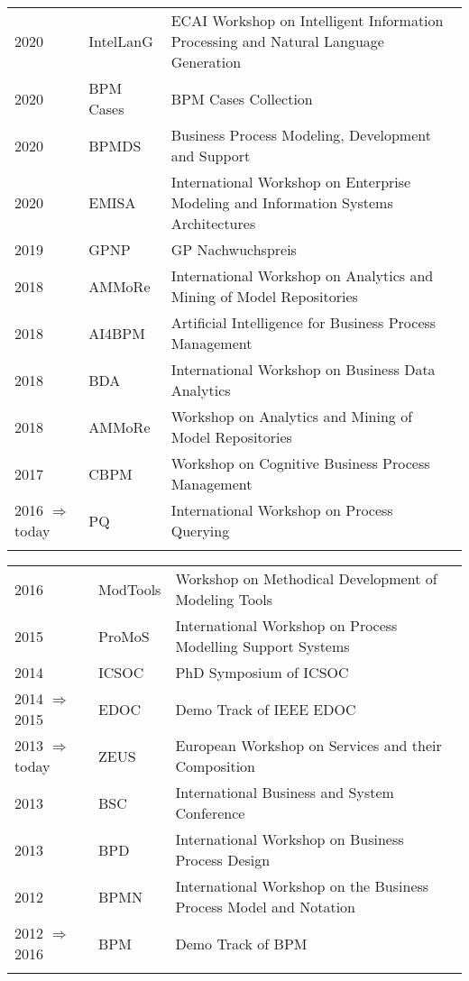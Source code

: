 \raggedright
\begin{tabular}{P{2.5cm}P{2cm}P{11cm}}
2020												& IntelLanG 	& ECAI Workshop on Intelligent Information Processing and Natural Language Generation \\\noalign{\smallskip}
2020												& BPM Cases& BPM Cases Collection \\\noalign{\smallskip}
2020												& BPMDS		& Business Process Modeling, Development and Support\\\noalign{\smallskip}
2020												& EMISA		& International Workshop on Enterprise Modeling and Information Systems Architectures \\\noalign{\smallskip}
2019												& GPNP			& GP Nachwuchspreis \\\noalign{\smallskip}
2018												& AMMoRe	& International Workshop on Analytics and Mining of Model Repositories\\\noalign{\smallskip}
2018												& AI4BPM	 	& Artificial Intelligence for Business Process Management \\\noalign{\smallskip}
2018												& BDA			& International Workshop on Business Data Analytics \\\noalign{\smallskip}
2018												& AMMoRe	& Workshop on Analytics and Mining of Model Repositories \\\noalign{\smallskip}
2017												& CBPM		& Workshop on Cognitive Business Process Management \\\noalign{\smallskip}
2016  $\Rightarrow$ today				& PQ				& International Workshop on Process Querying \\\noalign{\smallskip}
\end{tabular}
\raggedright
\begin{tabular}{P{2.5cm}P{2cm}P{11cm}}
2016												& ModTools	& Workshop on Methodical Development of Modeling Tools\\\noalign{\smallskip}
2015												& ProMoS		& International Workshop on Process Modelling Support Systems\\\noalign{\smallskip}
2014												& ICSOC		& PhD Symposium of ICSOC \\\noalign{\smallskip}
2014  $\Rightarrow$ 2015				& EDOC		& Demo Track of IEEE EDOC\\\noalign{\smallskip}
2013  $\Rightarrow$ today				& ZEUS			& European Workshop on Services and their Composition\\\noalign{\smallskip}
2013												& BSC			& International Business and System Conference \\\noalign{\smallskip}
2013												& BPD			& International Workshop on Business Process Design\\\noalign{\smallskip}
2012												& BPMN		& International Workshop on the Business Process Model and Notation\\\noalign{\smallskip}
2012  $\Rightarrow$ 2016				& BPM			& Demo Track of BPM\\\noalign{\smallskip}
\end{tabular}


